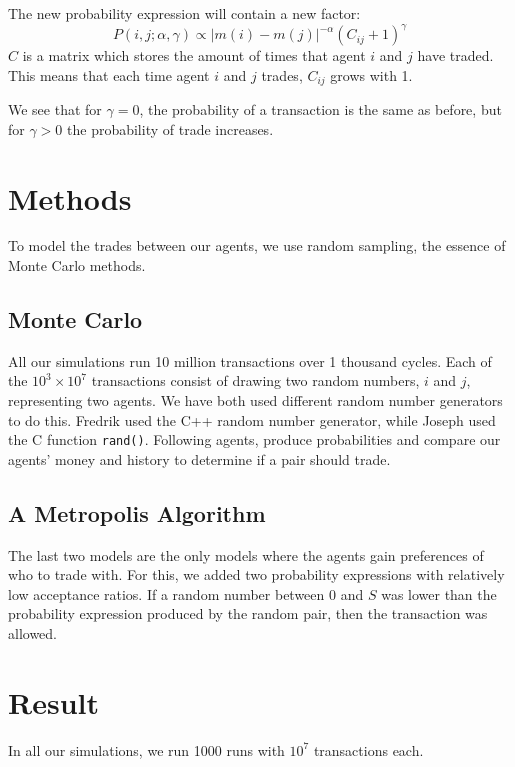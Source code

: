 \documentclass[12pt,a4paper]{article}
\begin{document}
The new probability expression will contain a new factor:
\begin{equation}
 P(i,j;\alpha,\gamma) \propto \left|m(i)-m(j) \right|^{-\alpha}(C_{ij} + 1)^{\gamma}
\end{equation}
$C$ is a matrix which stores the amount of times that agent $i$ and $j$ have traded.
This means that each time agent $i$ and $j$ trades, $C_{ij}$ grows with 1.

We see that for $\gamma = 0$, the probability of a transaction is the same as before, but for
$\gamma > 0$ the probability of trade increases.

\clearpage

\section{Methods}

To model the trades between our agents, we use random sampling, the essence of Monte Carlo methods.

\subsection{Monte Carlo}
All our simulations run 10 million transactions over 1 thousand cycles. Each of the $10^3 \times 10^7$ transactions consist of drawing two random numbers, $i$ and $j$, representing two agents.
We have both used different random number generators to do this. Fredrik used the C++ random number generator, while Joseph used the C function \verb|rand()|.
Following agents, produce probabilities and compare our agents' money and history to determine if a
pair should trade.

\subsection{A Metropolis Algorithm}
The last two models are the only models where the agents gain preferences of who to trade with. For this, we added two probability expressions with relatively low acceptance ratios.
If a random number between $0$ and $S$ was lower than the probability expression produced by the random pair, then the transaction was allowed.

\clearpage

\section{Result}

In all our simulations, we run 1000 runs with $10^7$ transactions each.
\end{document}
